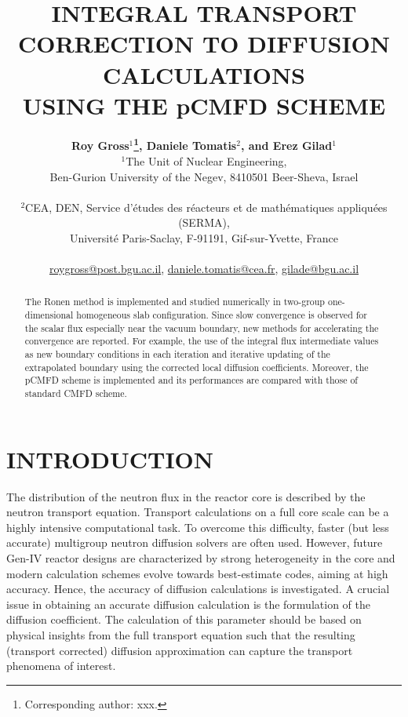 \documentclass[letterpaper]{physor2020}
\title{INTEGRAL TRANSPORT CORRECTION TO DIFFUSION CALCULATIONS\\USING THE pCMFD SCHEME}
\author{%
  \textbf{Roy Gross$^1$\footnote{Corresponding author: xxx.},
          Daniele Tomatis$^2$,
          and Erez Gilad$^1$} \\
  $^1$The Unit of Nuclear Engineering, \\
  Ben-Gurion University of the Negev, 8410501 Beer-Sheva, Israel \\
\\
  $^2$CEA, DEN, Service d’\'etudes des r\'eacteurs et
      de math\'ematiques appliqu\'ees (SERMA), \\
    Universit\'e Paris-Saclay, F-91191, Gif-sur-Yvette, France \\
     \\
  \url{roygross@post.bgu.ac.il},
  \url{daniele.tomatis@cea.fr},
  \url{gilade@bgu.ac.il}
}
\begin{document}
\maketitle
\justify

\begin{abstract}
  The Ronen method is implemented and studied numerically in two-group one-dimensional homogeneous slab configuration. Since slow convergence is observed for the scalar flux especially near the vacuum boundary, new methods for accelerating the convergence are reported. For example, the use of the integral flux intermediate values as new boundary conditions in each iteration and iterative updating of the extrapolated boundary using the corrected local diffusion coefficients. Moreover, the pCMFD scheme is implemented and its performances are compared with those of standard CMFD scheme.
\end{abstract}

\section{INTRODUCTION}
\label{sec:intro}

The distribution of the neutron flux in the reactor core is described by the neutron transport equation. Transport calculations on a full core scale can be a highly intensive computational task. To overcome this difficulty, faster (but less accurate) multigroup neutron diffusion solvers are often used. However, future Gen-IV reactor designs are characterized by strong heterogeneity in the core and modern calculation schemes evolve towards best-estimate codes, aiming at high accuracy. Hence, the accuracy of diffusion calculations is investigated. A crucial issue in obtaining an accurate diffusion calculation is the formulation of the diffusion coefficient. The calculation of this parameter should be based on physical insights from the full transport equation such that the resulting (transport corrected) diffusion approximation can capture the transport phenomena of interest.
\end{document}
